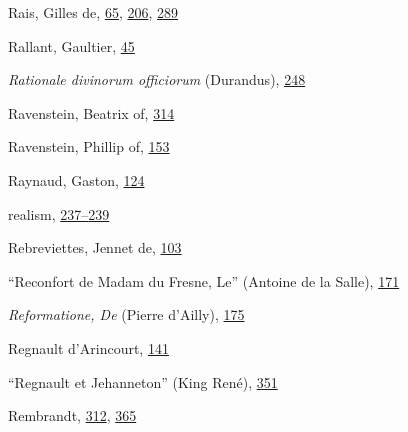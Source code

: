 Rais, Gilles de,
\protect\hyperlink{10_Chapter_Three__THE_HEROIC_DREAM.xhtmlux5cux23page_65}{65},
\protect\hyperlink{14_Chapter_Seven__THE_PIOUS_PERSONA.xhtmlux5cux23page_206}{206},
\protect\hyperlink{18_Chapter_Eleven__THE_FORMS_OF_THO.xhtmlux5cux23page_289}{289}

Rallant, Gaultier,
\protect\hyperlink{09_Chapter_Two__THE_CRAVING_FOR_A_M.xhtmlux5cux23page_45}{45}

\emph{Rationale divinorum officiorum} (Durandus),
\protect\hyperlink{16_Chapter_Nine__THE_DECLINE_OF_SYM.xhtmlux5cux23page_248}{248}

Ravenstein, Beatrix of,
\protect\hyperlink{20_ILLUSTRATIONS_FOLLOW_PAGE.xhtmlux5cux23page_314}{314}

Ravenstein, Phillip of,
\protect\hyperlink{11_Chapter_Four__THE_FORMS_OF_LOVE.xhtmlux5cux23page_153}{153}

Raynaud, Gaston,
\protect\hyperlink{10_Chapter_Three__THE_HEROIC_DREAM.xhtmlux5cux23page_124}{124}

realism,
\protect\hyperlink{16_Chapter_Nine__THE_DECLINE_OF_SYM.xhtmlux5cux23page_237}{237--}\protect\hyperlink{16_Chapter_Nine__THE_DECLINE_OF_SYM.xhtmlux5cux23page_239}{239}

Rebreviettes, Jennet de,
\protect\hyperlink{10_Chapter_Three__THE_HEROIC_DREAM.xhtmlux5cux23page_103}{103}

``Reconfort de Madam du Fresne, Le'' (Antoine de la Salle),
\protect\hyperlink{12_Chapter_Five__THE_VISION_OF_DEAT.xhtmlux5cux23page_171}{171}

\emph{Reformatione, De} (Pierre d'Ailly),
\protect\hyperlink{13_Chapter_Six__THE_DEPICTION_OF_TH.xhtmlux5cux23page_175}{175}

Regnault d'Arincourt,
\protect\hyperlink{11_Chapter_Four__THE_FORMS_OF_LOVE.xhtmlux5cux23page_141}{141}

``Regnault et Jehanneton'' (King René),
\protect\hyperlink{21_Chapter_Thirteen__IMAGE_AND_WORD.xhtmlux5cux23page_351}{351}

Rembrandt,
\protect\hyperlink{20_ILLUSTRATIONS_FOLLOW_PAGE.xhtmlux5cux23page_312}{312},
\protect\hyperlink{21_Chapter_Thirteen__IMAGE_AND_WORD.xhtmlux5cux23page_365}{365}

